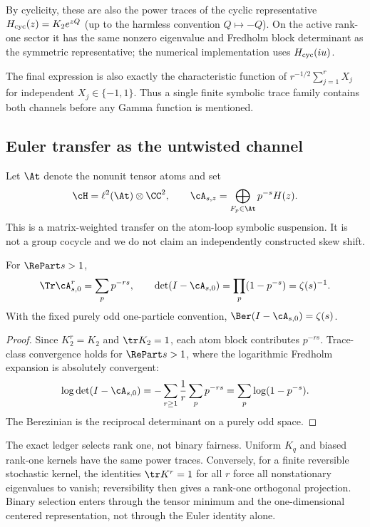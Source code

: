 By cyclicity, these are also the power traces of the cyclic representative
$H_{\rm cyc}(z)=K_2e^{zQ}$ (up to the harmless convention
$Q\mapsto-Q$). On the active rank-one sector it has the same nonzero
eigenvalue and Fredholm block determinant as the symmetric representative;
the numerical implementation uses $H_{\rm cyc}(iu)$.

The final expression is also exactly the characteristic function of
$r^{-1/2}\sum_{j=1}^rX_j$ for independent $X_j\in\{-1,1\}$. Thus a single
finite symbolic trace family contains both channels before any Gamma function
is mentioned.

\subsection{Euler transfer as the untwisted channel}

Let $\At$ denote the nonunit tensor atoms and set
\[
 \cH=\ell^2(\At)\otimes\CC^2,
 \qquad
 \cA_{s,z}=\bigoplus_{F_p\in\At}p^{-s}H(z).
\]
This is a matrix-weighted transfer on the atom-loop symbolic suspension. It is
not a group cocycle and we do not claim an independently constructed skew
shift.

\begin{theorem}
\label{thm:euler}
For $\RePart s>1$,
\[
 \Tr\cA_{s,0}^r=\sum_p p^{-rs},
 \qquad
 \det(I-\cA_{s,0})=\prod_p(1-p^{-s})=\zeta(s)^{-1}.
\]
With the fixed purely odd one-particle convention,
$\Ber(I-\cA_{s,0})=\zeta(s)$.
\end{theorem}

\begin{proof}
Since $K_2^r=K_2$ and $\tr K_2=1$, each atom block contributes $p^{-rs}$.
Trace-class convergence holds for $\RePart s>1$, where the logarithmic
Fredholm expansion is absolutely convergent:
\[
 \log\det(I-\cA_{s,0})
 =-\sum_{r\ge1}\frac1r\sum_pp^{-rs}
 =\sum_p\log(1-p^{-s}).
\]
The Berezinian is the reciprocal determinant on a purely odd space.
\end{proof}

The exact ledger selects rank one, not binary fairness. Uniform $K_q$ and
biased rank-one kernels have the same power traces. Conversely, for a finite
reversible stochastic kernel, the identities $\tr K^r=1$ for all $r$ force
all nonstationary eigenvalues to vanish; reversibility then gives a rank-one
orthogonal projection. Binary selection enters through the tensor minimum and
the one-dimensional centered representation, not through the Euler identity
alone.
